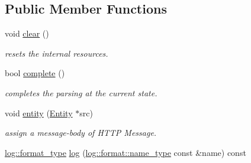 \subsection*{Public Member Functions}
\begin{DoxyCompactItemize}
\item 
\hypertarget{classhryky_1_1http_1_1body_1_1_reader_a68e5c48b02b4a6a3f854cf18b19f6ae5}{void \hyperlink{classhryky_1_1http_1_1body_1_1_reader_a68e5c48b02b4a6a3f854cf18b19f6ae5}{clear} ()}\label{classhryky_1_1http_1_1body_1_1_reader_a68e5c48b02b4a6a3f854cf18b19f6ae5}

\begin{DoxyCompactList}\small\item\em resets the internal resources. \end{DoxyCompactList}\item 
\hypertarget{classhryky_1_1http_1_1body_1_1_reader_afa01cb8ef57b5b038067c0a3f12758c9}{bool \hyperlink{classhryky_1_1http_1_1body_1_1_reader_afa01cb8ef57b5b038067c0a3f12758c9}{complete} ()}\label{classhryky_1_1http_1_1body_1_1_reader_afa01cb8ef57b5b038067c0a3f12758c9}

\begin{DoxyCompactList}\small\item\em completes the parsing at the current state. \end{DoxyCompactList}\item 
\hypertarget{classhryky_1_1http_1_1body_1_1_reader_a94cf6a5f213d0a426f2bb9a324fbcb54}{void \hyperlink{classhryky_1_1http_1_1body_1_1_reader_a94cf6a5f213d0a426f2bb9a324fbcb54}{entity} (\hyperlink{classhryky_1_1http_1_1body_1_1_entity}{Entity} $\ast$src)}\label{classhryky_1_1http_1_1body_1_1_reader_a94cf6a5f213d0a426f2bb9a324fbcb54}

\begin{DoxyCompactList}\small\item\em assign a message-\/body of H\-T\-T\-P Message. \end{DoxyCompactList}\item 
\hypertarget{classhryky_1_1http_1_1body_1_1_reader_a8b198deb36ef9002b55e374b23eb014f}{\hyperlink{namespacehryky_1_1log_ad50448c3f934f1eacd5c1bcffe8111e1}{log\-::format\-\_\-type} \hyperlink{classhryky_1_1http_1_1body_1_1_reader_a8b198deb36ef9002b55e374b23eb014f}{log} (\hyperlink{namespacehryky_1_1log_1_1format_ab7408d1e2ed2d648dbf9bba69eb74288}{log\-::format\-::name\-\_\-type} const \&name) const }\label{classhryky_1_1http_1_1body_1_1_reader_a8b198deb36ef9002b55e374b23eb014f}


\end{DoxyCompactItemize}
